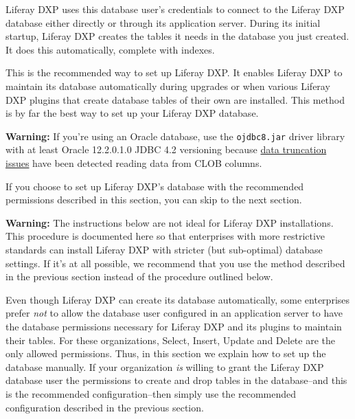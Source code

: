\noindent\hrulefill

Liferay DXP uses this database user's credentials to connect to the
Liferay DXP database either directly or through its application server.
During its initial startup, Liferay DXP creates the tables it needs in
the database you just created. It does this automatically, complete with
indexes.

This is the recommended way to set up Liferay DXP. It enables Liferay
DXP to maintain its database automatically during upgrades or when
various Liferay DXP plugins that create database tables of their own are
installed. This method is by far the best way to set up your Liferay DXP
database.

\noindent\hrulefill

\textbf{Warning:} If you're using an Oracle database, use the
\texttt{ojdbc8.jar} driver library with at least Oracle 12.2.0.1.0 JDBC
4.2 versioning because
\href{https://issues.liferay.com/browse/LPS-79229}{data truncation
issues} have been detected reading data from CLOB columns.

\noindent\hrulefill

If you choose to set up Liferay DXP's database with the recommended
permissions described in this section, you can skip to the next section.

\noindent\hrulefill

\textbf{Warning:} The instructions below are not ideal for Liferay DXP
installations. This procedure is documented here so that enterprises
with more restrictive standards can install Liferay DXP with stricter
(but sub-optimal) database settings. If it's at all possible, we
recommend that you use the method described in the previous section
instead of the procedure outlined below.

\noindent\hrulefill

Even though Liferay DXP can create its database automatically, some
enterprises prefer \emph{not} to allow the database user configured in
an application server to have the database permissions necessary for
Liferay DXP and its plugins to maintain their tables. For these
organizations, Select, Insert, Update and Delete are the only allowed
permissions. Thus, in this section we explain how to set up the database
manually. If your organization \emph{is} willing to grant the Liferay
DXP database user the permissions to create and drop tables in the
database--and this is the recommended configuration--then simply use the
recommended configuration described in the previous section.

